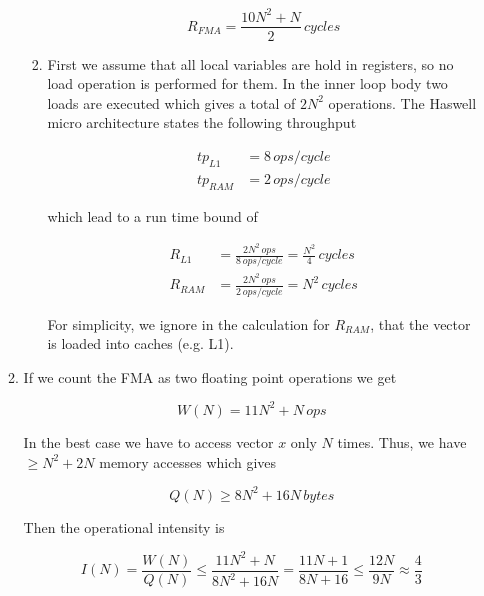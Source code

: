 \documentclass[a4paper]{article}
\begin{document}
\begin{enumerate}
\begin{enumerate}
\begin{enumerate}
            \begin{equation*}
                R_{FMA} = \frac{10N^2+N}{2} \, cycles
            \end{equation*}
            
            \item First we assume that all local variables are hold in registers, so no load operation is performed for them. In the inner loop body two loads are executed which gives a total of $2N^2$ operations. The Haswell micro architecture states the following throughput
            
            \begin{align*}
                tp_{L1} &= 8 \, ops / cycle \\
                tp_{RAM} &= 2 \, ops / cycle
            \end{align*}
            
            which lead to a run time bound of
            
            \begin{align*}
                R_{L1} &= \frac{2N^2 \, ops}{8 \, ops/cycle} = \frac{N^2}{4} \, cycles \\
                R_{RAM} &= \frac{2N^2 \, ops}{2 \, ops/cycle} = N^2 \, cycles
            \end{align*}
            
            For simplicity, we ignore in the calculation for $R_{RAM}$, that the vector is loaded into caches (e.g. L1).
        \end{enumerate}
        
        \item If we count the FMA as two floating point operations we get
        
        \begin{equation*}
            W(N) = 11N^2 + N \, ops
        \end{equation*}
        
        In the best case we have to access vector $x$ only $N$ times. Thus, we have $\geq N^2 + 2N$ memory accesses which gives
        
        \begin{equation*}
            Q(N) \geq 8N^2 + 16N \, bytes
        \end{equation*}
        
        Then the operational intensity is 
        
        \begin{equation*}
            I(N) = \frac{W(N)}{Q(N)} \leq \frac{11N^2 + N}{8N^2 + 16N} = \frac{11N+1}{8N+16} \leq \frac{12N}{9N} \approx \frac{4}{3}
        \end{equation*}
    \end{enumerate}
    

\end{enumerate}
\end{document}
